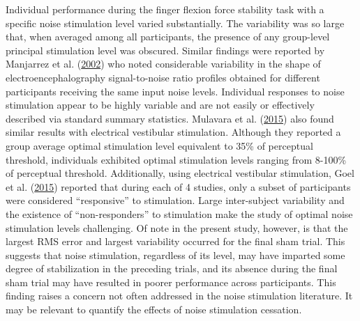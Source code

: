 \documentclass[]{cik}%
\begin{document}
Individual performance during the finger flexion force stability task
with a specific noise stimulation level varied substantially. The
variability was so large that, when averaged among all participants, the
presence of any group-level principal stimulation level was obscured.
Similar findings were reported by Manjarrez et al.
(\protect\hyperlink{ref-Manjarrez2002}{2002}) who noted considerable
variability in the shape of electroencephalography signal-to-noise ratio
profiles obtained for different participants receiving the same input
noise levels. Individual responses to noise stimulation appear to be
highly variable and are not easily or effectively described via standard
summary statistics. Mulavara et al.
(\protect\hyperlink{ref-Mulavara2015}{2015}) also found similar results
with electrical vestibular stimulation. Although they reported a group
average optimal stimulation level equivalent to 35\% of perceptual
threshold, individuals exhibited optimal stimulation levels ranging from
8-100\% of perceptual threshold. Additionally, using electrical
vestibular stimulation, Goel et al.
(\protect\hyperlink{ref-Goel2015}{2015}) reported that during each of 4
studies, only a subset of participants were considered ``responsive'' to
stimulation. Large inter-subject variability and the existence of
``non-responders'' to stimulation make the study of optimal noise
stimulation levels challenging. Of note in the present study, however,
is that the largest RMS error and largest variability occurred for the
final sham trial. This suggests that noise stimulation, regardless of
its level, may have imparted some degree of stabilization in the
preceding trials, and its absence during the final sham trial may have
resulted in poorer performance across participants. This finding raises
a concern not often addressed in the noise stimulation literature. It
may be relevant to quantify the effects of noise stimulation cessation.
\end{document}
